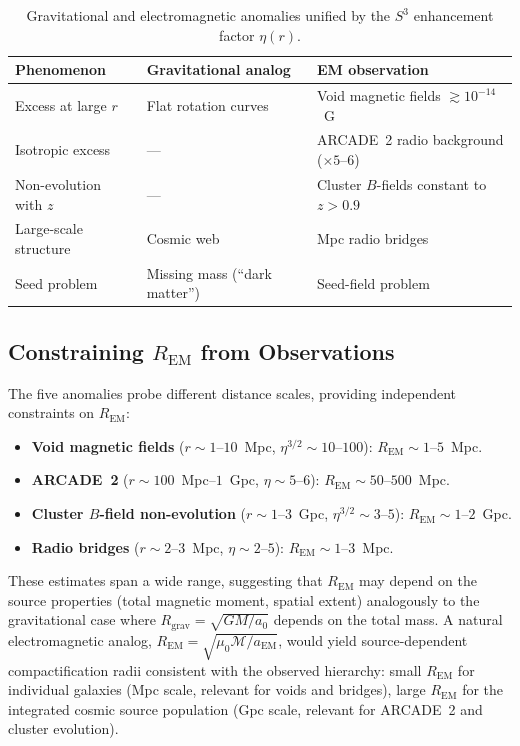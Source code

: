 \documentclass[a4paper]{article}
\begin{document}
\begin{table}[ht]
\centering
\caption{Gravitational and electromagnetic anomalies unified by the $S^3$
enhancement factor $\eta(r)$.}
\begin{tabular}{lll}
\toprule
\textbf{Phenomenon} & \textbf{Gravitational analog} & \textbf{EM observation} \\
\midrule
Excess at large $r$ & Flat rotation curves & Void magnetic fields $\gtrsim 10^{-14}$~G \\
Isotropic excess & --- & ARCADE~2 radio background ($\times 5$--$6$) \\
Non-evolution with $z$ & --- & Cluster $B$-fields constant to $z > 0.9$ \\
Large-scale structure & Cosmic web & Mpc radio bridges \\
Seed problem & Missing mass (``dark matter'') & Seed-field problem \\
\bottomrule
\end{tabular}
\label{tab:unified}
\end{table}

\subsection{Constraining $R_{\text{EM}}$ from Observations}

The five anomalies probe different distance scales, providing independent
constraints on $R_{\text{EM}}$:

\begin{itemize}
\item \textbf{Void magnetic fields} ($r \sim 1$--$10$~Mpc, $\eta^{3/2} \sim 10$--$100$):
  $R_{\text{EM}} \sim 1$--$5$~Mpc.
\item \textbf{ARCADE~2} ($r \sim 100$~Mpc--$1$~Gpc, $\eta \sim 5$--$6$):
  $R_{\text{EM}} \sim 50$--$500$~Mpc.
\item \textbf{Cluster $B$-field non-evolution} ($r \sim 1$--$3$~Gpc, $\eta^{3/2} \sim 3$--$5$):
  $R_{\text{EM}} \sim 1$--$2$~Gpc.
\item \textbf{Radio bridges} ($r \sim 2$--$3$~Mpc, $\eta \sim 2$--$5$):
  $R_{\text{EM}} \sim 1$--$3$~Mpc.
\end{itemize}

These estimates span a wide range, suggesting that $R_{\text{EM}}$ may depend on
the source properties (total magnetic moment, spatial extent) analogously to the
gravitational case where $R_{\text{grav}} = \sqrt{GM/a_0}$ depends on the total
mass. A natural electromagnetic analog,
$R_{\text{EM}} = \sqrt{\mu_0 \mathcal{M}/a_{\text{EM}}}$, would yield
source-dependent compactification radii consistent with the observed hierarchy:
small $R_{\text{EM}}$ for individual galaxies (Mpc scale, relevant for voids and
bridges), large $R_{\text{EM}}$ for the integrated cosmic source population
(Gpc scale, relevant for ARCADE~2 and cluster evolution).
\end{document}
